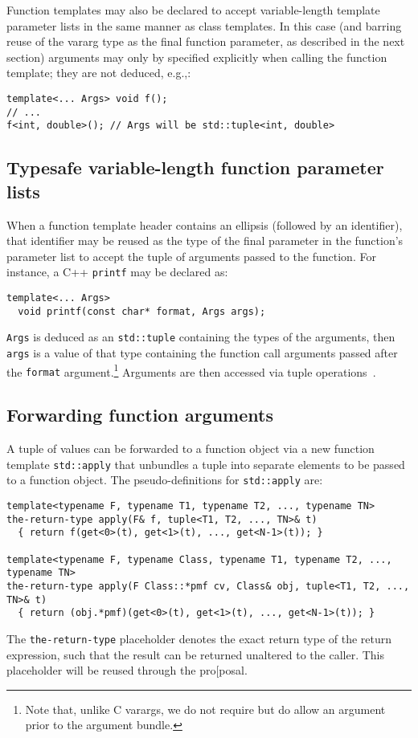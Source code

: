 \documentclass{article}
\begin{document}
Function templates may also be declared to accept variable-length
template parameter lists in the same manner as class templates. In
this case (and barring reuse of the vararg type as the final function
parameter, as described in the next section) arguments may only by
specified explicitly when calling the function template; they are not
deduced, e.g.,:

\begin{verbatim}
template<... Args> void f();
// ... 
f<int, double>(); // Args will be std::tuple<int, double>
\end{verbatim}

\subsection{Typesafe variable-length function parameter lists}
When a function template header contains an ellipsis (followed by an
identifier), that identifier may be reused as the type of the final
parameter in the function's parameter list to accept the tuple of
arguments passed to the function. For instance, a C++ {\tt printf} may
be declared as:
\begin{verbatim}
template<... Args>
  void printf(const char* format, Args args);
\end{verbatim}

{\tt Args} is deduced as an {\tt std::tuple} containing the types of
the arguments, then {\tt args} is a value of that type containing the
function call arguments passed after the {\tt format}
argument.\footnote{Note that, unlike C varargs, we do not require but
  do allow an argument prior to the argument bundle.} Arguments are
then accessed via tuple operations~\cite{Jarvi02}.

\subsection{Forwarding function arguments}
A tuple of values can be forwarded to a function object via a new
function template {\tt std::apply} that unbundles a tuple into
separate elements to be passed to a function object. The
pseudo-definitions for {\tt std::apply} are:
\begin{verbatim}
template<typename F, typename T1, typename T2, ..., typename TN>
the-return-type apply(F& f, tuple<T1, T2, ..., TN>& t)
  { return f(get<0>(t), get<1>(t), ..., get<N-1>(t)); }

template<typename F, typename Class, typename T1, typename T2, ..., typename TN>
the-return-type apply(F Class::*pmf cv, Class& obj, tuple<T1, T2, ..., TN>& t)
  { return (obj.*pmf)(get<0>(t), get<1>(t), ..., get<N-1>(t)); }
\end{verbatim}
The {\tt the-return-type} placeholder denotes the exact return type of
the return expression, such that the result can be returned unaltered to the caller. This placeholder will be reused through the pro[posal.
\end{document}
